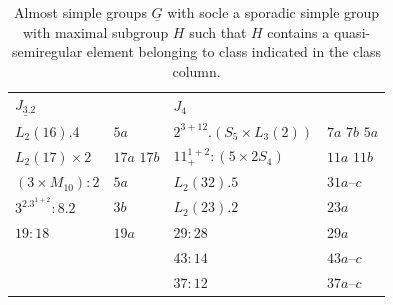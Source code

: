 \documentclass{article}
\theoremstyle{remark}
\theoremstyle{definition}
\newcommand{\qsre}{quasi-semiregular element}
\begin{document}
\begin{table}[h]
\begin{tabular}{|l | l || l|l| }
$\underline{J_3.2}$           &                           & \underline{$J_4$}             &  \\
$L_2(16).4$                   & $5a$                 & $2^{3+12}.(S_5 \times L_3(2))$                        & $7a$ $7b$ $5a$  \\
$ L_2(17)\times 2$            & $17a$ $17b$               & $11_+^{1+2}:(5\times 2S_4)$   & $11a$ $11b$  \\
$(3\times M_{10}):2$          & $5a$               & $L_2(32).5$                   & $31a$--$c$  \\
$3^2.3^{1+2}:8.2$             & $3b$               & $L_2(23).2$                   & $23a$  \\
$19:18$                          & $19a$                 & $29:28$                        & $29a$  \\
                                &                       & $43:14$                       & $43a$--$c$  \\
&& $37:12 $                      & $37a$--$c$  \\ \hline
\end{tabular}
    \caption{Almost simple groups $\underline{G}$  with socle a sporadic simple group with maximal subgroup $H$ such that $H$ contains a {\qsre} belonging to class indicated in the class column.}
    \label{tab:spor1}
\end{table}
\end{document}
